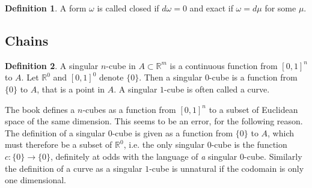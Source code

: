 \documentclass[20pt]{article}
\theoremstyle{plain}
\theoremstyle{definition}
\newtheorem{definition}{Definition}
\newcommand{\reals}{\mathbb{R}}
\begin{document}
\begin{definition}
  A form $\omega$ is called closed if $d\omega = 0$ and exact if $\omega = d\mu$ for some $\mu. $
\end{definition} 




 



 



 



 



 



 



 



 



 



 



 



 



 



 



 



 



 

\subsection{Chains}

\begin{definition}
   A singular $n$-cube in $A \subset \reals^m$ is a continuous function from 
   $[0,1]^n$ to $A$.  Let $\reals^0$ and $[0,1]^0$ denote $\{0\}$.
   Then a singular $0$-cube is a function from $\{0\}$ to $A$, that is a point 
   in $A$.
   A singular $1$-cube is often called a curve.
\end{definition}
\color{Blue}
The book defines a $n$-cubes as a function from $[0, 1]^n$ to a subset of 
Euclidean space of the same dimension.  This seems to be an error, for the following reason.
The definition of a singular $0$-cube is given as a function from $\{0\}$ to $A$, which 
must therefore be a subset of $\reals^0$, i.e. the only 
singular $0$-cube is the function $c: \{0\} \to \{0\}$, definitely at odds with the 
language of \textit{a} singular $0$-cube.
Similarly the definition of a curve as a singular $1$-cube is unnatural if 
the codomain is only one dimensional.
\color{Black}
\end{document}
